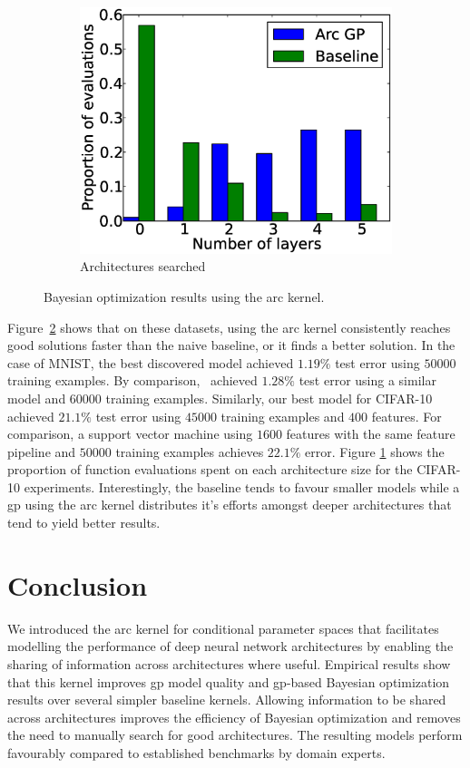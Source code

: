 \documentclass{article}
\newcommand{\gp}{{\sc gp}}
\begin{document}
\begin{figure}[t!]
\begin{subfigure}[]{\columnwidth}
		\includegraphics[width=\columnwidth]{figures/fevals_per_layer}
		\caption{Architectures searched}
		\label{fig:proparchs}
	\end{subfigure}
	\caption{Bayesian optimization results using the arc kernel.}
	\label{fig:arcbo}
\vspace{-0.3cm}
\end{figure}

Figure~\ref{fig:arcbo} shows that on these datasets, using the arc kernel consistently reaches good solutions faster than the naive baseline, or it finds a better solution. In the case of MNIST, the best discovered model achieved $1.19\%$ test error using $50000$ training examples. By comparison,~\cite{wan2013regularization} achieved $1.28\%$ test error using a similar model and $60000$ training examples. Similarly, our best model for CIFAR-10 achieved $21.1\%$ test error using $45000$ training examples and $400$ features. For comparison, a support vector machine using $1600$ features with the same feature pipeline and $50000$ training examples achieves $22.1\%$ error. Figure \ref{fig:proparchs} shows the proportion of function evaluations spent on each architecture size for the CIFAR-10 experiments. Interestingly, the baseline tends to favour smaller models while a \gp{} using the arc kernel distributes it's efforts amongst deeper architectures that tend to yield better results.

\section{Conclusion}
\vspace{-0.05in} 
We introduced the arc kernel for conditional parameter spaces that facilitates modelling the performance of deep neural network architectures by enabling the sharing of information across architectures where useful.
Empirical results show that this kernel improves \gp{} model quality and \gp{}-based Bayesian optimization results over several simpler baseline kernels.
Allowing information to be shared across architectures improves the efficiency of Bayesian optimization and removes the need to manually search for good architectures.
The resulting models perform favourably compared to established benchmarks by domain experts.
\end{document}
